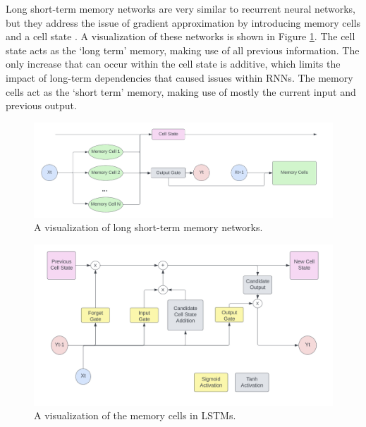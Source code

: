 Long short-term memory networks are very similar to recurrent neural networks, but they address the issue of gradient approximation by introducing memory cells and a cell state \citep{hochreiter1997long}. A visualization of these networks is shown in Figure \ref{fig:LSTM}. The cell state acts as the `long term' memory, making use of all previous information. The only increase that can occur within the cell state is additive, which limits the impact of long-term dependencies that caused issues within RNNs. The memory cells act as the `short term' memory, making use of mostly the current input and previous output.

\begin{figure}[ht]
    \centering
    \includegraphics[width=0.8\linewidth]{"Figures/LSTM_Architecture.png"}
    \caption{A visualization of long short-term memory networks.}
    \label{fig:LSTM}
\end{figure}

\begin{figure}[ht]
    \centering
    \includegraphics[width=0.6\linewidth]{"Figures/LSTM_Memory_Cell.png"}
    \caption{A visualization of the memory cells in LSTMs.}
    \label{fig:MemoryCells}
\end{figure}

